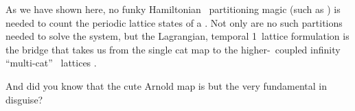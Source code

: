 As we have shown here, no funky Hamiltonian \statesp\ partitioning magic
(such as ) is needed to count the periodic
lattice states of a \templatt. Not only are no such partitions needed to
solve the system, but the Lagrangian, temporal 1\dmn\ lattice formulation
is the bridge that takes us from the single cat map  to
the higher-\dmn\ coupled infinity ``multi-cat'' \spt\ lattices
.

And did you know that the cute Arnold map is but the very fundamental
{\sPe} in disguise?


\renewcommand{\period}[1]{{\ensuremath{T_{#1}}}}         %
